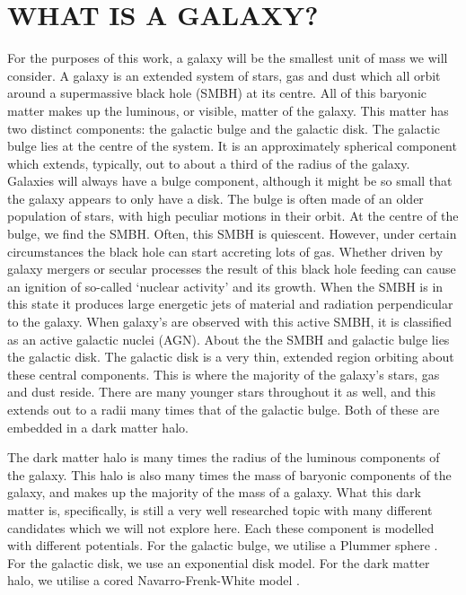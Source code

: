\section{WHAT IS A GALAXY?}
\noindent For the purposes of this work, a galaxy will be the smallest unit of mass we will consider. A galaxy is an extended system of stars, gas and dust which all orbit around a supermassive black hole (SMBH) at its centre. All of this baryonic matter makes up the luminous, or visible, matter of the galaxy. This matter has two distinct components: the galactic bulge and the galactic disk. The galactic bulge lies at the centre of the system. It is an approximately spherical component which extends, typically, out to about a third of the radius of the galaxy. Galaxies will always have a bulge component, although it might be so small that the galaxy appears to only have a disk. The bulge is often made of an older population of stars, with high peculiar motions in their orbit. At the centre of the bulge, we find the SMBH. Often, this SMBH is quiescent. However, under certain circumstances the black hole can start accreting lots of gas. Whether driven by galaxy mergers \citep{2006ApJS..163....1H, 2014MNRAS.438.1839B} or secular processes \citep{2012ApJ...757..179A, 2017MNRAS.470.1559S} the result of this black hole feeding can cause an ignition of so-called `nuclear activity' and its growth. When the SMBH is in this state it produces large energetic jets of material and radiation perpendicular to the galaxy. When galaxy's are observed with this active SMBH, it is classified as an active galactic nuclei (AGN). About the the SMBH and galactic bulge lies the galactic disk. The galactic disk is a very thin, extended region orbiting about these central components. This is where the majority of the galaxy's stars, gas and dust reside. There are many younger stars throughout it as well, and this extends out to a radii many times that of the galactic bulge. Both of these are embedded in a dark matter halo.

The dark matter halo is many times the radius of the luminous components of the galaxy. This halo is also many times the mass of baryonic components of the galaxy, and makes up the majority of the mass of a galaxy. What this dark matter is, specifically, is still a very well researched topic with many different candidates which we will not explore here. Each these component is modelled with different potentials. For the galactic bulge, we utilise a Plummer sphere \citep{1911MNRAS..71..460P}. For the galactic disk, we use an exponential disk model. For the dark matter halo, we utilise a cored Navarro-Frenk-White model \citep{1997ApJ...490..493N}.

